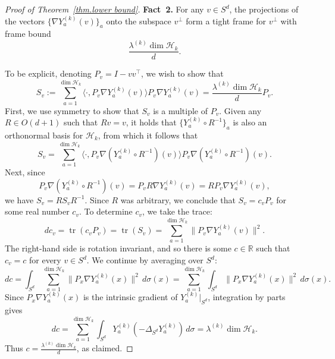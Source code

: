 \documentclass[12pt]{article}
\theoremstyle{plain}
\theoremstyle{definition}
\theoremstyle{remark}
\begin{document}
\begin{proof}[Proof of Theorem~\ref{thm.lower bound}]
\medskip
\noindent
\textbf{Fact~2.}
For any $v\in S^d$, the projections of the vectors
$\{\nabla Y^{(k)}_a(v)\}_a$ onto the subspace $v^\perp$ form a tight frame for
$v^\perp$ with frame bound
\[
\frac{\lambda^{(k)}\operatorname{dim}\mathcal H_k}{d}.
\]

To be explicit, denoting $P_v=I-vv^\top$, we wish to show that
\[
S_v
:=
\sum_{a=1}^{\operatorname{dim}\mathcal H_k}
\langle\cdot,P_v\nabla Y^{(k)}_a(v)\rangle
P_v\nabla Y^{(k)}_a(v)
=
\frac{\lambda^{(k)}\operatorname{dim}\mathcal H_k}{d}P_v.
\]
First, we use symmetry to show that $S_v$ is a multiple of $P_v$.
Given any $R\in O(d+1)$ such that $Rv=v$, it holds that
$\{Y^{(k)}_a\circ R^{-1}\}_a$ is also an orthonormal basis for $\mathcal H_k$,
from which it follows that
\[
S_v
=
\sum_{a=1}^{\operatorname{dim}\mathcal H_k}
\langle\cdot,P_v\nabla(Y^{(k)}_a\circ R^{-1})(v)\rangle
P_v\nabla(Y^{(k)}_a\circ R^{-1})(v).
\]
Next, since
\[
P_v\nabla(Y^{(k)}_a\circ R^{-1})(v)
=
P_vR\nabla Y^{(k)}_a(v)
=
RP_v\nabla Y^{(k)}_a(v),
\]
we have $S_v=RS_vR^{-1}$.
Since $R$ was arbitrary, we conclude that $S_v=c_vP_v$ for some real number
$c_v$.
To determine $c_v$, we take the trace:
\[
dc_v
=
\operatorname{tr}(c_vP_v)
=
\operatorname{tr}(S_v)
=
\sum_{a=1}^{\operatorname{dim}\mathcal H_k}
\|P_v\nabla Y^{(k)}_a(v)\|^2.
\]
The right-hand side is rotation invariant, and so there is some $c\in\mathbb R$
such that $c_v=c$ for every $v\in S^d$.
We continue by averaging over $S^d$:
\[
dc
=
\int_{S^d}
\sum_{a=1}^{\operatorname{dim}\mathcal H_k}
\|P_x\nabla Y^{(k)}_a(x)\|^2\,d\sigma(x)
=
\sum_{a=1}^{\operatorname{dim}\mathcal H_k}
\int_{S^d}
\|P_x\nabla Y^{(k)}_a(x)\|^2\,d\sigma(x).
\]
Since $P_x\nabla Y^{(k)}_a(x)$ is the intrinsic gradient of
$Y^{(k)}_a|_{S^d}$, integration by parts gives
\[
dc
=
\sum_{a=1}^{\operatorname{dim}\mathcal H_k}
\int_{S^d}
Y^{(k)}_a(-\Delta_{S^d}Y^{(k)}_a)\,d\sigma
=
\lambda^{(k)}\operatorname{dim}\mathcal H_k.
\]
Thus $c=\frac{\lambda^{(k)}\operatorname{dim}\mathcal H_k}{d}$,
as claimed.


\end{proof}
\end{document}
